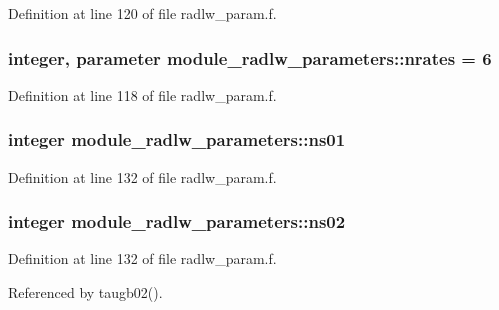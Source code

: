 Definition at line 120 of file radlw\+\_\+param.\+f.

\subsubsection[{\texorpdfstring{nrates}{nrates}}]{\setlength{\rightskip}{0pt plus 5cm}integer, parameter module\+\_\+radlw\+\_\+parameters\+::nrates = 6}\hypertarget{namespacemodule__radlw__parameters_a86288e4bbe3d6962505488790ff42bfa}{}\label{namespacemodule__radlw__parameters_a86288e4bbe3d6962505488790ff42bfa}


Definition at line 118 of file radlw\+\_\+param.\+f.

\subsubsection[{\texorpdfstring{ns01}{ns01}}]{\setlength{\rightskip}{0pt plus 5cm}integer module\+\_\+radlw\+\_\+parameters\+::ns01}\hypertarget{namespacemodule__radlw__parameters_a0f82508bbb4039ebbc3fcb68e8e4e699}{}\label{namespacemodule__radlw__parameters_a0f82508bbb4039ebbc3fcb68e8e4e699}


Definition at line 132 of file radlw\+\_\+param.\+f.

\subsubsection[{\texorpdfstring{ns02}{ns02}}]{\setlength{\rightskip}{0pt plus 5cm}integer module\+\_\+radlw\+\_\+parameters\+::ns02}\hypertarget{namespacemodule__radlw__parameters_a8b13d877f08e7c26333285fd1db19d4e}{}\label{namespacemodule__radlw__parameters_a8b13d877f08e7c26333285fd1db19d4e}


Definition at line 132 of file radlw\+\_\+param.\+f.



Referenced by taugb02().

